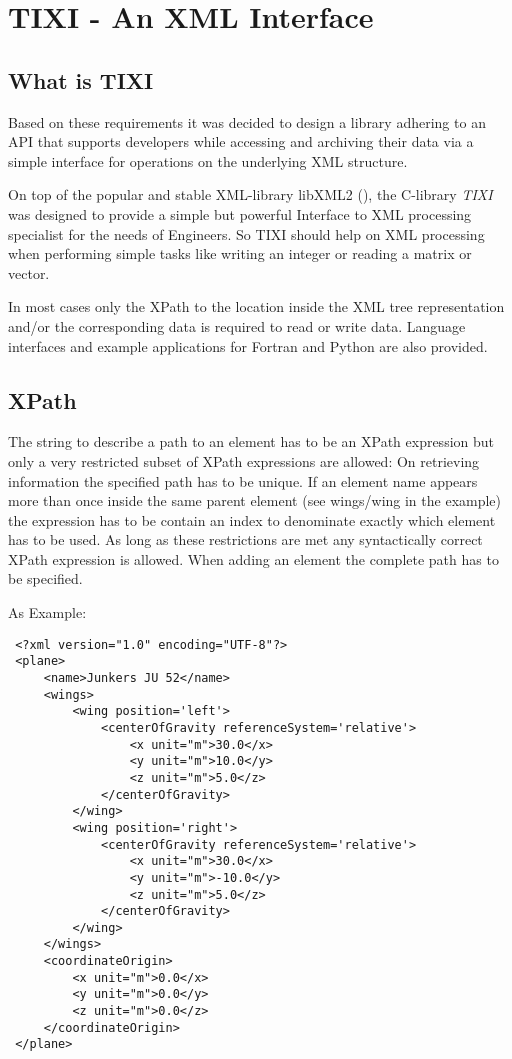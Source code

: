 
\chapter{TIXI - An XML Interface}\label{hints}

\section{What is TIXI}\label{tixiIntro}
Based on these requirements it was decided to design a library adhering to an API that supports developers while accessing and archiving their data via a simple interface for operations on the underlying XML structure.

On top of the popular and stable XML-library libXML2 (), the C-library \emph{TIXI} was designed to provide a simple but powerful Interface to XML processing specialist for the needs of Engineers. So TIXI should help on XML processing when performing simple tasks like writing an integer or reading a matrix or vector.

In most cases only the XPath to the location inside the XML tree representation and/or the corresponding data is required to read or write data.
Language interfaces and example applications for Fortran and Python are also provided.


\section{XPath}\label{lblxpath}
The string to describe a path to an element has to be an XPath expression but only a very restricted subset of XPath expressions are allowed: 
On retrieving information the specified path has to be unique. 
If an element name appears more than once inside the same parent element (see wings/wing in the example) the expression has to be contain an index to denominate exactly which element has to be used. 
As long as these restrictions are met any syntactically correct XPath expression is allowed. When adding an element the complete path has to be specified.

As Example:

\begin{verbatim}
 <?xml version="1.0" encoding="UTF-8"?>
 <plane>
     <name>Junkers JU 52</name>
     <wings>
         <wing position='left'>
             <centerOfGravity referenceSystem='relative'>
                 <x unit="m">30.0</x>
                 <y unit="m">10.0</y>
                 <z unit="m">5.0</z>
             </centerOfGravity>
         </wing>
         <wing position='right'>
             <centerOfGravity referenceSystem='relative'>
                 <x unit="m">30.0</x>
                 <y unit="m">-10.0</y>
                 <z unit="m">5.0</z>
             </centerOfGravity>
         </wing>
     </wings>
     <coordinateOrigin>
         <x unit="m">0.0</x>
         <y unit="m">0.0</y>
         <z unit="m">0.0</z>
     </coordinateOrigin>
 </plane>
\end{verbatim}


